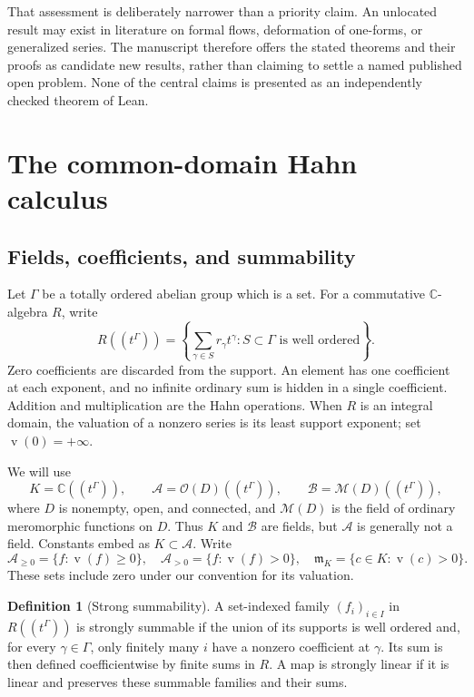 \documentclass[11pt,a4paper]{article}
\numberwithin{equation}{section}
\theoremstyle{definition}
\newtheorem{definition}[definition]{Definition}
\theoremstyle{remark}
\newcommand{\C}{\mathbb C}
\newcommand{\A}{\mathcal A}
\newcommand{\Oh}{\mathcal O}
\newcommand{\Mh}{\mathcal M}
\newcommand{\mm}{\mathfrak m}
\newcommand{\val}{\operatorname{v}}
\begin{document}
That assessment is deliberately narrower than a priority claim.  An
unlocated result may exist in literature on formal flows, deformation of
one-forms, or generalized series.  The manuscript therefore offers the
stated theorems and their proofs as candidate new results, rather than
claiming to settle a named published open problem.  None of the central
claims is presented as an independently checked theorem of Lean.

\section{The common-domain Hahn calculus}
\label{sec:hahn}

\subsection{Fields, coefficients, and summability}

Let $\Gamma$ be a totally ordered abelian group which is a set.  For a
commutative $\C$-algebra $R$, write
\[
 R((t^\Gamma))=
 \left\{\sum_{\gamma\in S}r_\gamma t^\gamma:
              S\subset\Gamma\text{ is well ordered}\right\}.
\]
Zero coefficients are discarded from the support.  An element has one
coefficient at each exponent, and no infinite ordinary sum is hidden in a
single coefficient.  Addition and multiplication are the Hahn operations.
When $R$ is an integral domain, the valuation of a nonzero series is its
least support exponent; set $\val(0)=+\infty$.

We will use
\[
 K=\C((t^\Gamma)),\qquad
 \A=\Oh(D)((t^\Gamma)),\qquad
 \mathcal B=\Mh(D)((t^\Gamma)),
\]
where $D$ is nonempty, open, and connected, and $\Mh(D)$ is the field of
ordinary meromorphic functions on $D$.  Thus $K$ and $\mathcal B$ are
fields, but $\A$ is generally not a field.  Constants embed as $K\subset\A$.
Write
\[
 \A_{\geq0}=\{f:\val(f)\geq0\},\quad
 \A_{>0}=\{f:\val(f)>0\},\quad
 \mm_K=\{c\in K:\val(c)>0\}.
\]
These sets include zero under our convention for its valuation.

\begin{definition}[Strong summability]\label{def:summability}
A set-indexed family $(f_i)_{i\in I}$ in $R((t^\Gamma))$ is strongly
summable if the union of its supports is well ordered and, for every
$\gamma\in\Gamma$, only finitely many $i$ have a nonzero coefficient at
$\gamma$.  Its sum is then defined coefficientwise by finite sums in $R$.
A map is strongly linear if it is linear and preserves these summable
families and their sums.
\end{definition}
\end{document}
